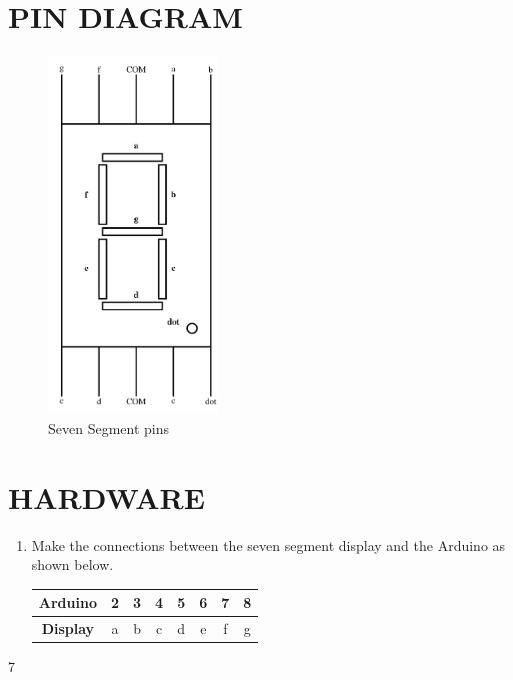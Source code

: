 \documentclass[journal,12pt,twocolumn]{IEEEtran}
\begin{document}
\section{PIN DIAGRAM}
\begin{figure}[H]
\centering
\includegraphics[width=0.4\textwidth]{pin.jpg}
\caption{Seven Segment pins}
\label{fig:div5 circuit.jpg}
\end{figure}



\section{HARDWARE}
\begin{enumerate}
\item Make the connections between the seven segment display and the Arduino as shown below.\\
	\begin{table}[h!]
    \centering
    \small  %
    \begin{tabular}{|c|c|c|c|c|c|c|c|}
        \hline
        \textbf{Arduino}  & 2 & 3 & 4 & 5 & 6 & 7 & 8\\
        \hline
        \textbf{Display} &a&b&c&d&e&f&g\\
        \hline
    \end{tabular}
\end{table} 


\end{enumerate}7
\end{document}
